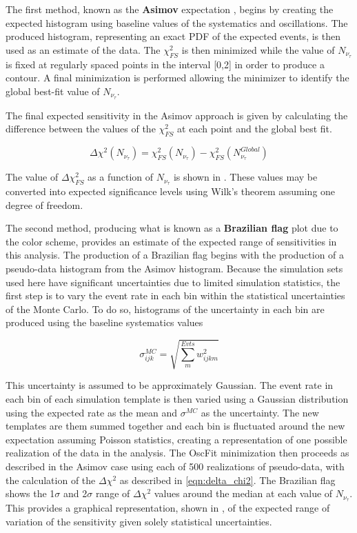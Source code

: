 The first method, known as the \textbf{Asimov} expectation , begins by creating the expected histogram using baseline values of the systematics and oscillations.
The produced histogram, representing an exact PDF of the expected events, is then used as an estimate of the data.
The $\chi^2_{FS}$ is then minimized while the value of $N_{\nu_{\tau}}$ is fixed at regularly spaced points in the interval [0,2] in order to produce a contour.
A final minimization is performed allowing the minimizer to identify the global best-fit value of $N_{\nu_{\tau}}$.

The final expected sensitivity in the Asimov approach is given by calculating the difference between the values of the $\chi^2_{FS}$ at each point and the global best fit.

\label{eqn:delta_chi2}
\begin{equation}
	\Delta \chi^2 \left(N_{\nu_{\tau}}\right) = \chi^2_{FS}\left(N_{\nu_{\tau}}\right)  - \chi^2_{FS}\left(N^{Global}_{\nu_{\tau}}\right)
\end{equation}

The value of $\Delta \chi^2_{FS}$ as a function of $N_{\nu_{\tau}}$ is shown in .
These values may be converted into expected significance levels using Wilk's theorem  assuming one degree of freedom.

The second method, producing what is known as a \textbf{Brazilian flag} plot due to the color scheme, provides an estimate of the expected range of sensitivities in this analysis.
The production of a Brazilian flag begins with the production of a pseudo-data histogram from the Asimov histogram.
Because the simulation sets used here have significant uncertainties due to limited simulation statistics, the first step is to vary the event rate in each bin within the statistical uncertainties of the Monte Carlo.
To do so, histograms of the uncertainty in each bin are produced using the baseline systematics values

\begin{equation}
	\sigma^{MC}_{ijk} = \sqrt{\sum_m^{Evts} w^2_{ijkm}}
\end{equation}

This uncertainty is assumed to be approximately Gaussian.
The event rate in each bin of each simulation template is then varied using a Gaussian distribution using the expected rate as the mean and $\sigma^{MC}$ as the uncertainty.
The new templates are them summed together and each bin is fluctuated around the new expectation assuming Poisson statistics, creating a representation of one possible realization of the data in the analysis.
The OscFit minimization then proceeds as described in the Asimov case using each of 500 realizations of pseudo-data, with the calculation of the $\Delta \chi^2$ as described in \ref{eqn:delta_chi2}.
The Brazilian flag shows the 1$\sigma$ and 2$\sigma$ range of $\Delta \chi^2$ values around the median at each value of $N_{\nu_{\tau}}$.
This provides a graphical representation, shown in , of the expected range of variation of the sensitivity given solely statistical uncertainties.

